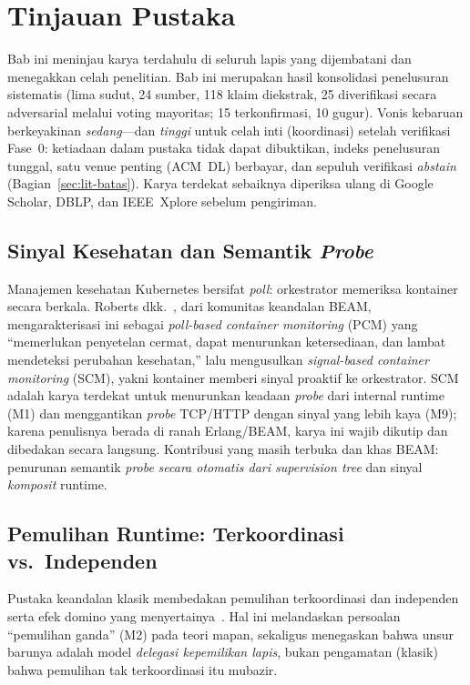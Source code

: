 \chapter{Tinjauan Pustaka}
\label{ch:litreview}

Bab ini meninjau karya terdahulu di seluruh lapis yang dijembatani dan menegakkan celah
penelitian. Bab ini merupakan hasil konsolidasi penelusuran sistematis (lima sudut,
24 sumber, 118 klaim diekstrak, 25 diverifikasi secara adversarial melalui voting
mayoritas; 15 terkonfirmasi, 10 gugur). Vonis kebaruan berkeyakinan \emph{sedang}---dan
\emph{tinggi} untuk celah inti (koordinasi) setelah verifikasi Fase~0: ketiadaan
dalam pustaka tidak dapat dibuktikan, indeks penelusuran tunggal, satu venue penting
(ACM~DL) berbayar, dan sepuluh verifikasi \emph{abstain} (Bagian~\ref{sec:lit-batas}). Karya
terdekat sebaiknya diperiksa ulang di Google Scholar, DBLP, dan IEEE~Xplore sebelum
pengiriman.

\section{Sinyal Kesehatan dan Semantik \emph{Probe}}
\label{sec:lit-health}
Manajemen kesehatan Kubernetes bersifat \emph{poll}: orkestrator memeriksa kontainer
secara berkala. Roberts dkk.~\cite{roberts2025}, dari komunitas keandalan BEAM,
mengarakterisasi ini sebagai \emph{poll-based container monitoring} (PCM) yang ``memerlukan
penyetelan cermat, dapat menurunkan ketersediaan, dan lambat mendeteksi perubahan
kesehatan,'' lalu mengusulkan \emph{signal-based container monitoring} (SCM), yakni
kontainer memberi sinyal proaktif ke orkestrator. SCM adalah karya terdekat untuk
menurunkan keadaan \emph{probe} dari internal runtime (M1) dan menggantikan \emph{probe}
TCP/HTTP dengan sinyal yang lebih kaya (M9); karena penulisnya berada di ranah Erlang/BEAM,
karya ini wajib dikutip dan dibedakan secara langsung. Kontribusi yang masih terbuka dan
khas BEAM: penurunan semantik \emph{probe} \emph{secara otomatis dari supervision tree} dan
sinyal \emph{komposit} runtime.

\section{Pemulihan Runtime: Terkoordinasi vs.\ Independen}
\label{sec:lit-recovery}
Pustaka keandalan klasik membedakan pemulihan terkoordinasi dan independen serta efek
domino yang menyertainya~\cite{elnozahy2002}. Hal ini melandaskan persoalan ``pemulihan
ganda'' (M2) pada teori mapan, sekaligus menegaskan bahwa unsur barunya adalah model
\emph{delegasi kepemilikan lapis}, bukan pengamatan (klasik) bahwa pemulihan tak
terkoordinasi itu mubazir.

